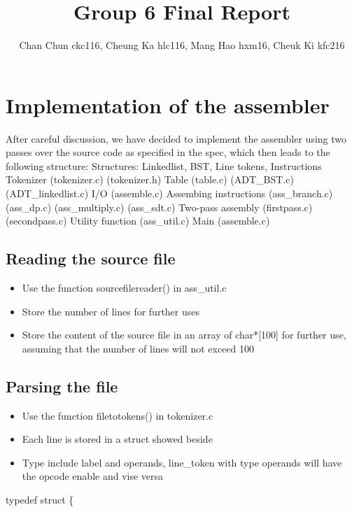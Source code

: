 \documentclass[11pt]{article}
\begin{document}
\title{Group 6 Final Report}
\author{Chan Chun ckc116, Cheung Ka hlc116, Mang Hao hxm16, Cheuk Ki kfc216}

\maketitle

\section{Implementation of the assembler}

 
After careful discussion, we have decided to implement the assembler using two passes over the source code as specified in the spec, which then leads to the following structure:\newline\newline
Structures:
Linkedlist,
BST,
Line tokens,
Instructions
\newline
Tokenizer
(tokenizer.c)
(tokenizer.h)\newline
Table
(table.c)
(ADT{\_}BST.c)
(ADT{\_}linkedlist.c)\newline
I/O
(assemble.c)\newline
Assembing instructions
(ass{\_}branch.c)
(ass{\_}dp.c)
(ass{\_}multiply.c)
(ass{\_}sdt.c)\newline
Two-pass assembly
(firstpass.c)
(secondpass.c)\newline
Utility function
(ass{\_}util.c)\newline
Main
(assemble.c)

\subsection{Reading the source file}
\begin{itemize}  
\item Use the function sourcefilereader()  in ass{\_}util.c

\item Store the number of lines for further uses 

\item Store the content of the source file in an array of char*[100] for further use, assuming that the number of lines will not exceed 100  

\end{itemize}





\subsection{Parsing the file}
\begin{itemize}  
\item Use the function filetotokens() in tokenizer.c


\item Each line is stored in a struct showed beside

\item Type include label and operands, line{\_}token with type operands will have the opcode enable and vise versa

\end{itemize}
typedef struct \{
     
\end{document}
